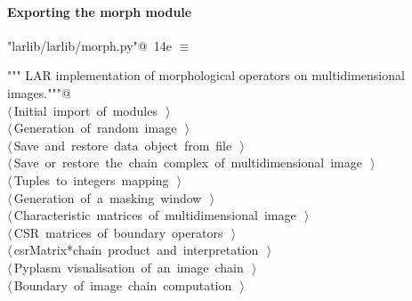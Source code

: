 \documentclass[11pt,oneside]{article}	%
\begin{document}
\paragraph{Exporting the morph module}
\begin{flushleft} \small \label{scrap26}
\protect{}\verb@"larlib/larlib/morph.py"@\nobreak\ {\footnotesize 14e }$\equiv$
\vspace{-1ex}
\begin{list}{}{} \item
\mbox{}\verb@""" LAR implementation of morphological operators on multidimensional images."""@\\
\mbox{}\verb@@\hbox{$\langle\,$Initial import of modules\nobreak\ {\footnotesize {}}$\,\rangle$}\verb@@\\
\mbox{}\verb@@\hbox{$\langle\,$Generation of random image\nobreak\ {\footnotesize {}}$\,\rangle$}\verb@@\\
\mbox{}\verb@@\hbox{$\langle\,$Save and restore data object from file\nobreak\ {\footnotesize {}}$\,\rangle$}\verb@@\\
\mbox{}\verb@@\hbox{$\langle\,$Save or restore the chain complex of multidimensional image\nobreak\ {\footnotesize {}}$\,\rangle$}\verb@@\\
\mbox{}\verb@@\hbox{$\langle\,$Tuples to integers mapping\nobreak\ {\footnotesize {}}$\,\rangle$}\verb@@\\
\mbox{}\verb@@\hbox{$\langle\,$Generation of a masking window\nobreak\ {\footnotesize {}}$\,\rangle$}\verb@@\\
\mbox{}\verb@@\hbox{$\langle\,$Characteristic matrices of multidimensional image\nobreak\ {\footnotesize {}}$\,\rangle$}\verb@@\\
\mbox{}\verb@@\hbox{$\langle\,$CSR matrices of boundary operators\nobreak\ {\footnotesize {}}$\,\rangle$}\verb@@\\
\mbox{}\verb@@\hbox{$\langle\,$csrMatrix*chain product and interpretation\nobreak\ {\footnotesize {}}$\,\rangle$}\verb@@\\
\mbox{}\verb@@\hbox{$\langle\,$Pyplasm visualisation of an image chain\nobreak\ {\footnotesize {}}$\,\rangle$}\verb@@\\
\mbox{}\verb@@\hbox{$\langle\,$Boundary of image chain computation\nobreak\ {\footnotesize {}}$\,\rangle$}\verb@@\\

\end{list}
\end{flushleft}
\end{document}

